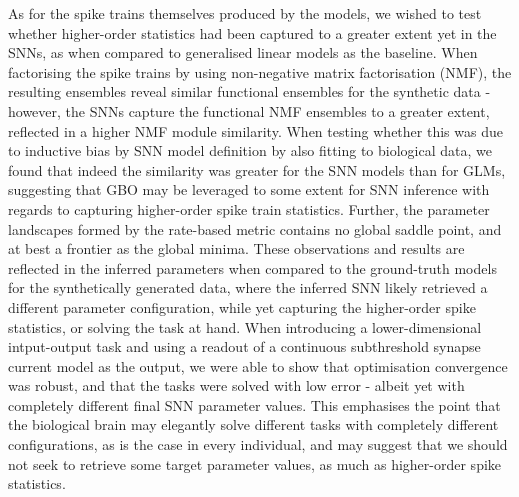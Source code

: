 \documentclass[mphil,deptreport,ianc]{infthesis} %
\begin{document}
\begin{preliminary}
{    As for the spike trains themselves produced by the models, we wished to test whether higher-order statistics had been captured to a greater extent yet in the SNNs, as when compared to generalised linear models as the baseline.
    When factorising the spike trains by using non-negative matrix factorisation (NMF), the resulting ensembles reveal similar functional ensembles for the synthetic data - however, the SNNs capture the functional NMF ensembles to a greater extent, reflected in a higher NMF module similarity.
    When testing whether this was due to inductive bias by SNN model definition by also fitting to biological data, we found that indeed the similarity was greater for the SNN models than for GLMs, suggesting that GBO may be leveraged to some extent for SNN inference with regards to capturing higher-order spike train statistics.
    Further, the parameter landscapes formed by the rate-based metric contains no global saddle point, and at best a frontier as the global minima.
    These observations and results are reflected in the inferred parameters when compared to the ground-truth models for the synthetically generated data, where the inferred SNN likely retrieved a different parameter configuration, while yet capturing the higher-order spike statistics, or solving the task at hand.
    When introducing a lower-dimensional intput-output task and using a readout of a continuous subthreshold synapse current model as the output, we were able to show that optimisation convergence was robust, and that the tasks were solved with low error - albeit yet with completely different final SNN parameter values.
    This emphasises the point that the biological brain may elegantly solve different tasks with completely different configurations, as is the case in every individual, and may suggest that we should not seek to retrieve some target parameter values, as much as higher-order spike statistics.
}

\maketitle


\end{preliminary}
\end{document}
